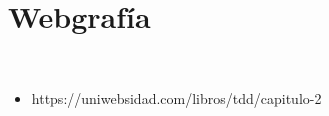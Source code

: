\section{Webgrafía} 
\textbf{}\\
\begin{flushleft}

\begin{itemize}

	\item https://uniwebsidad.com/libros/tdd/capitulo-2

\end{itemize} 


\end{flushleft}